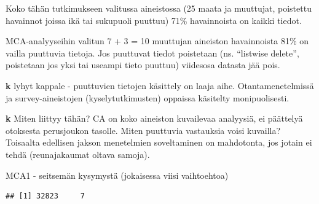 \documentclass[
  finnish,
]{book}
\newenvironment{Shaded}{\begin{snugshade}}{\end{snugshade}}
\newcommand{\CommentTok}[1]{\textcolor[rgb]{0.56,0.35,0.01}{\textit{#1}}}
\begin{document}
\begin{Shaded}
\end{Shaded}

Koko tähän tutkimukseen valitussa aineistossa (25 maata ja muuttujat, poistettu
havainnot joissa ikä tai sukupuoli puuttuu) 71\% havainnoista on kaikki tiedot.

MCA-analyyseihin valitun 7 + 3 = 10 muuttujan aineiston havainnoista 81\% on
vailla puuttuvia tietoja. Jos puuttuvat tiedot poistetaan (ns. ``listwise delete'',
poistetaan jos yksi tai useampi tieto puuttuu) viidesosa datasta jää pois.

\textbf{k} lyhyt kappale - puuttuvien tietojen käsittely on laaja aihe. Otantamenetelmissä ja survey-aineistojen (kyselytutkimusten) oppaissa käsitelty monipuolisesti.

\textbf{k} Miten liittyy tähän? CA on koko aineiston kuvailevaa analyysiä, ei päättelyä
otoksesta perusjoukon tasolle. Miten puuttuvia vastauksia voisi kuvailla? Toisaalta
edellisen jakson menetelmien soveltaminen on mahdotonta, jos jotain ei tehdä
(reunajakaumat oltava samoja).

MCA1 - seitsemän kysymystä (jokaisessa viisi vaihtoehtoa)

\begin{verbatim}
## [1] 32823     7
\end{verbatim}
\end{document}
